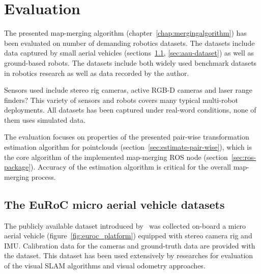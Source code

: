 \chapter{Evaluation}
\label{chap:evaluation}

The presented map-merging algorithm (chapter~\ref{chap:mergingalgorithm}) has been evaluated on number of demanding robotics datasets. The datasets include data captured by small aerial vehicles (sections~\ref{sec:euroc-dataset}, \ref{sec:aau-dataset}) as well as ground-based robots. The datasets include both widely used benchmark datasets in robotics research as well as data recorded by the author.

Sensors used include stereo rig cameras, active \gls{RGB-D} cameras and laser range finders? This variety of sensors and robots covers many typical multi-robot deployments. All datasets has been captured under real-word conditions, none of them uses simulated data.

The evaluation focuses on properties of the presented pair-wise transformation estimation algorithm for pointclouds (section~\ref{sec:estimate-pair-wise}), which is the core algorithm of the implemented map-merging \gls{ROS} node (section~\ref{sec:ros-package}). Accuracy of the estimation algorithm is critical for the overall map-merging process.

\section{The EuRoC micro aerial vehicle datasets}
\label{sec:euroc-dataset}

The publicly available dataset introduced by~\citet{Burri2016} was collected on-board a micro aerial vehicle (figure~\ref{fig:euroc_platform}) equipped with stereo camera rig and \gls{IMU}. Calibration data for the cameras and ground-truth data are provided with the dataset. This dataset has been used extensively by researches for evaluation of the visual \gls{SLAM} algorithms and visual odometry approaches.

